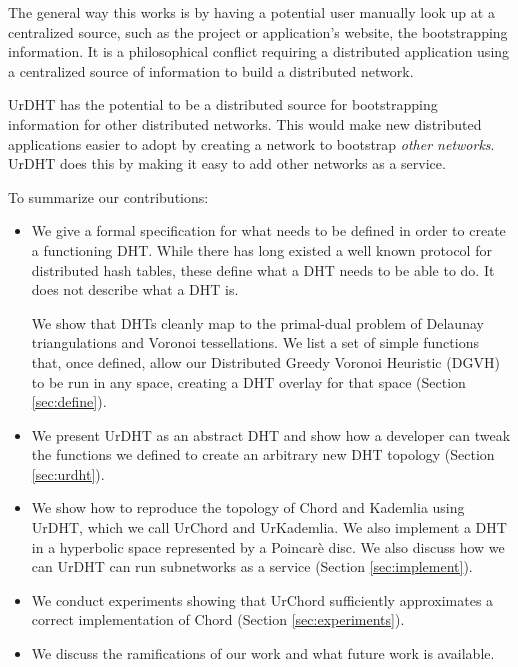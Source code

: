 \documentclass[11pt,conference]{IEEEtran}
\begin{document}
The general way this works is by having a potential user manually look up at a centralized source, such as the project or application's website, the bootstrapping information.
It is a philosophical conflict requiring a distributed application using a centralized source of information to build a distributed network.


UrDHT has the potential to be a distributed source for bootstrapping information for other distributed networks.
This would make new distributed applications easier to adopt by creating a network to bootstrap \textit{other networks}.
UrDHT does this by making it easy to add other networks as a service.

To summarize our contributions:
\begin{itemize}
	\item We give a formal specification for what needs to be defined in order to create a functioning DHT.
	While there has long existed a well known protocol for distributed hash tables, these define what a DHT needs to be able to do.
	It does not describe what a DHT is.
	
	We show that DHTs cleanly map to the primal-dual problem of Delaunay triangulations and Voronoi tessellations.
	We list a set  of simple functions that, once defined, allow our Distributed Greedy Voronoi Heuristic (DGVH) to be run in any space, creating a DHT overlay for that space (Section \ref{sec:define}).
	
	\item We present UrDHT as an abstract DHT and show how a developer can tweak the functions we defined to create an arbitrary new DHT topology (Section \ref{sec:urdht}).
	\item We show how to reproduce the topology of Chord and Kademlia using UrDHT, which we call UrChord and UrKademlia.
	We also implement a DHT in a hyperbolic  space represented  by a Poincar\`{e} disc.
	We also discuss how we can  UrDHT can run subnetworks as a service (Section \ref{sec:implement}).
	
	\item We conduct experiments showing that UrChord sufficiently approximates a correct implementation of Chord (Section \ref{sec:experiments}). 
	\item We discuss the ramifications of our work and what future work is available.
\end{itemize}
\end{document}
